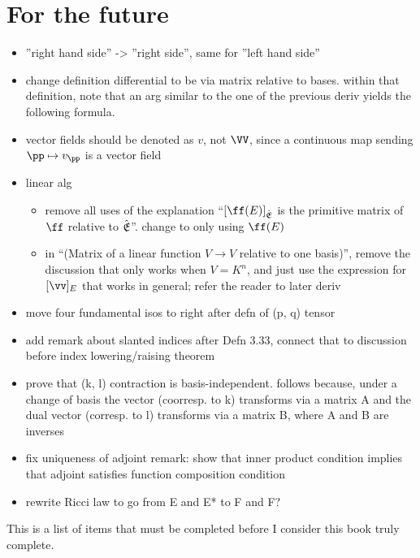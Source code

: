 \chapter*{For the future}

\begin{itemize}
    \item ''right hand side'' -> ''right side'', same for ''left hand side''
    \item change definition differential to be via matrix relative to bases. within that definition, note that an arg similar to the one of the previous deriv yields the following formula.
    \item vector fields should be denoted as $v$, not $\VV$, since a continuous map sending $\pp \mapsto v_\pp$ is a vector field
    \item linear alg
    \begin{itemize}
        \item remove all uses of the explanation ``$[\ff(E)]_{\sE}$ is the primitive matrix of $\ff$ relative to ${\hat{\mathfrak{E}}}$''. change to only using $\ff(E)$
        \item in ``(Matrix of a linear function $V \rightarrow V$ relative to one basis)'', remove the discussion that only works when $V = K^n$, and just use the expression for $[\vv]_E$ that works in general; refer the reader to later deriv
    \end{itemize}
    \item move four fundamental isos to right after defn of (p, q) tensor
    \item add remark about slanted indices after Defn 3.33, connect that to discussion before index lowering/raising theorem
    \item prove that (k, l) contraction is basis-independent. follows because, under a change of basis the vector (coorresp. to k) transforms via a matrix A and the dual vector (corresp. to l) transforms via a matrix B, where A and B are inverses
    \item fix uniqueness of adjoint remark: show that inner product condition implies that adjoint satisfies function composition condition
    \item rewrite Ricci law to go from E and E* to F and F?
\end{itemize}

\vspace{.5cm}

This is a list of items that must be completed before I consider this book truly complete.

